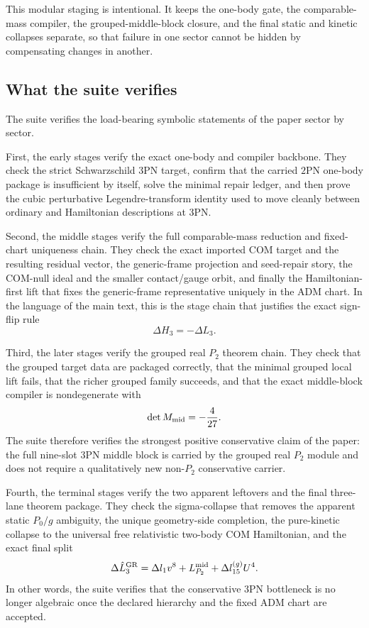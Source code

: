 \documentclass[11pt]{article}
\begin{document}
This modular staging is intentional.  It keeps the one-body gate, the
comparable-mass compiler, the grouped-middle-block closure, and the final static
and kinetic collapses separate, so that failure in one sector cannot be hidden
by compensating changes in another.

\subsection{What the suite verifies}
\label{sec:verification-verifies}

The suite verifies the load-bearing symbolic statements of the paper sector by
sector.

First, the early stages verify the exact one-body and compiler backbone.  They
check the strict Schwarzschild $3$PN target, confirm that the carried $2$PN
one-body package is insufficient by itself, solve the minimal repair ledger,
and then prove the cubic perturbative Legendre-transform identity used to move
cleanly between ordinary and Hamiltonian descriptions at $3$PN.

Second, the middle stages verify the full comparable-mass reduction and
fixed-chart uniqueness chain.  They check the exact imported COM target and the
resulting residual vector, the generic-frame projection and seed-repair story,
the COM-null ideal and the smaller contact/gauge orbit, and finally the
Hamiltonian-first lift that fixes the generic-frame representative uniquely in
the ADM chart.  In the language of the main text, this is the stage chain that
justifies the exact sign-flip rule
\begin{equation}
\Delta H_3=-\Delta L_3.
\label{eq:verification-signflip}
\end{equation}

Third, the later stages verify the grouped real $P_2$ theorem chain.  They check
that the grouped target data are packaged correctly, that the minimal grouped
local lift fails, that the richer grouped family succeeds, and that the exact
middle-block compiler is nondegenerate with
\begin{equation}
\det M_{\rm mid}=-\frac{4}{27}.
\label{eq:verification-det-mid}
\end{equation}
The suite therefore verifies the strongest positive conservative claim of the
paper: the full nine-slot $3$PN middle block is carried by the grouped real
$P_2$ module and does not require a qualitatively new non-$P_2$ conservative
carrier.

Fourth, the terminal stages verify the two apparent leftovers and the final
three-lane theorem package.  They check the sigma-collapse that removes the
apparent static \(P_0/g\) ambiguity, the unique geometry-side completion, the
pure-kinetic collapse to the universal free relativistic two-body COM
Hamiltonian, and the exact final split
\begin{equation}
\Delta \hat L_3^{\rm GR}
=
\Delta l_1 v^8
+
L_{P_2}^{\rm mid}
+
\Delta l_{15}^{(g)}U^4.
\label{eq:verification-final-split}
\end{equation}
In other words, the suite verifies that the conservative $3$PN bottleneck is no
longer algebraic once the declared hierarchy and the fixed ADM chart are
accepted.
\end{document}
